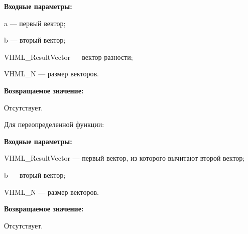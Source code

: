 \textbf{Входные параметры:}

  a --- первый вектор;
  
 b --- вторый вектор;
 
 VHML\_ResultVector --- вектор разности;
 
 VHML\_N --- размер векторов.

\textbf{Возвращаемое значение:}

Отсутствует.

Для переопределенной функции:

\textbf{Входные параметры:}

 VHML\_ResultVector --- первый вектор, из которого вычитают второй вектор;
  
 b --- вторый вектор;
 
 VHML\_N --- размер векторов.

\textbf{Возвращаемое значение:}

Отсутствует.